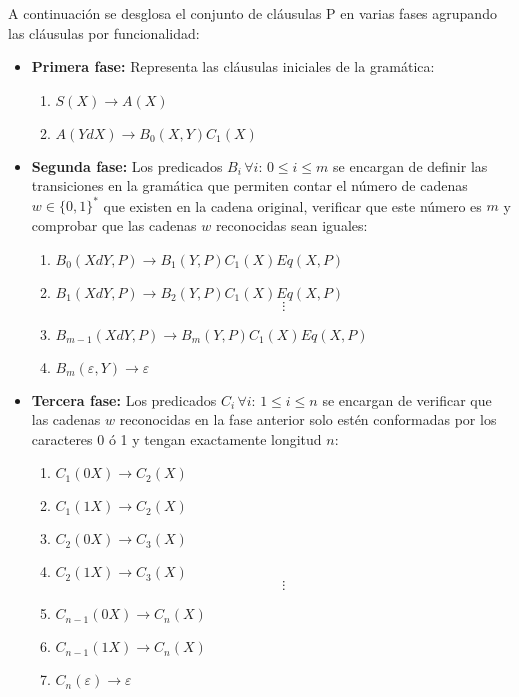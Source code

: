 A continuación se desglosa el conjunto de cláusulas P en varias fases agrupando las cláusulas por funcionalidad:
\begin{itemize}
    \item  \textbf{Primera fase:} Representa las cláusulas iniciales de la gramática:
          \begin{enumerate}
              \item $S(X)\to A(X)$
              \item $A(YdX)\to B_0(X,Y)C_1(X)$
          \end{enumerate}

    \item \textbf{Segunda fase:} Los predicados $B_i\,\forall i:\,0\leq i\leq m$ se encargan de definir las transiciones en la gramática
          que permiten contar el número de cadenas $w\in \{0,1\}^*$ que existen en la cadena original, verificar que
          este número es $m$ y comprobar que las cadenas $w$ reconocidas sean iguales:
          \begin{enumerate}[start=3]
              \item $B_0(XdY,P)\to B_1(Y,P) C_1(X) Eq(X,P)$
              \item $B_1(XdY,P)\to B_2(Y,P) C_1(X) Eq(X,P)$
                    $$\vdots$$
              \item $B_{m-1}(XdY,P)\to B_m(Y,P) C_1(X) Eq(X,P)$
              \item $B_m(\varepsilon,Y)\to \varepsilon$
          \end{enumerate}
    \item \textbf{Tercera fase:} Los predicados $C_i\,\forall i:\,1\leq i\leq n$ se encargan de verificar que las
          cadenas $w$ reconocidas en la fase anterior solo estén conformadas por los caracteres 0 ó 1 y tengan exactamente
          longitud $n$:
          \begin{enumerate}[start=7]
              \item $C_1(0X)\to C_2(X)$
              \item $C_1(1X)\to C_2(X)$
              \item $C_2(0X)\to C_3(X)$
              \item $C_2(1X)\to C_3(X)$
                    $$\vdots$$
              \item $C_{n-1}(0X)\to C_n(X)$
              \item $C_{n-1}(1X)\to C_n(X)$
              \item $C_n(\varepsilon)\to \varepsilon$
          \end{enumerate}
\end{itemize}

